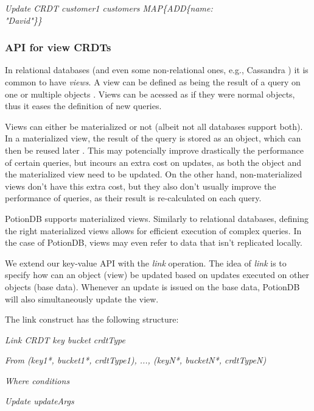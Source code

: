 \documentclass{vldb}
\newcommand{\emphvspace}{0.5\baselineskip}
\newcommand{\lineemph}[1]{\vspace{\emphvspace}\hspace{2em}\emph{#1}\vspace{\emphvspace}}
\newcommand{\firstblockemph}[1]{\vspace{\emphvspace}\hspace{2em}\emph{#1}}
\newcommand{\middleblockemph}[1]{\hspace{2em}\emph{#1}}
\newcommand{\lastblockemph}[1]{\hspace{2em}\emph{#1}\vspace{\emphvspace}}
\begin{document}
\lineemph{Update CRDT customer1 customers MAP\{ADD\{name: \\"David"\}\}}

\subsubsection{API for view CRDTs}
\label{subsubsec:APIView}

In relational databases (and even some non-relational ones, e.g., Cassandra \cite{???}) it is common to have \emph{views}. 
A view can be defined as being the result of a query on one or multiple objects \cite{???}.
Views can be acessed as if they were normal objects, thus it eases the definition of new queries.

Views can either be materialized or not (albeit not all databases support both). %
In a materialized view, the result of the query is stored as an object, which can then be reused later \cite{???}.
This may potencially improve drastically the performance of certain queries, but incours an extra cost on updates, as both the object and the materialized view need to be updated.
On the other hand, non-materialized views don't have this extra cost, but they also don't usually improve the performance of queries, as their result is re-calculated on each query.

PotionDB supports materialized views.
Similarly to relational databases, defining the right materialized views allows for efficient execution of complex queries.
In the case of PotionDB, views may even refer to data that isn't replicated locally.

We extend our key-value API with the \emph{link} operation.
The idea of \emph{link} is to specify how can an object (view) be updated based on updates executed on other objects (base data).
Whenever an update is issued on the base data, PotionDB will also simultaneously update the view.

The link construct has the following structure:

\firstblockemph{Link CRDT key bucket crdtType}

\middleblockemph{From (key1*, bucket1*, crdtType1), ..., (keyN*, bucketN*, crdtTypeN)}

\middleblockemph{Where conditions}

\lastblockemph{Update updateArgs}
\end{document}
